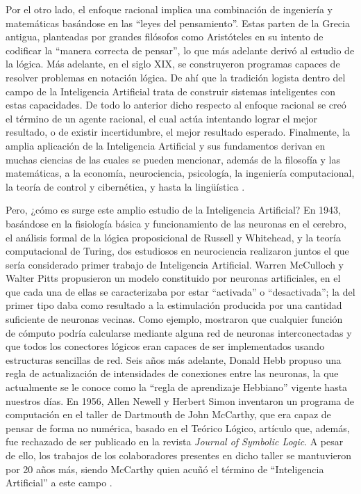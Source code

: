 Por el otro lado, el enfoque racional implica una combinación de ingeniería y matemáticas basándose en las “leyes del pensamiento”. Estas parten de la Grecia antigua, planteadas por grandes filósofos como Aristóteles en su intento de codificar la “manera correcta de pensar”, lo que más adelante derivó al estudio de la lógica. Más adelante, en el siglo XIX, se construyeron programas capaces de resolver problemas en notación lógica. De ahí que la tradición logista dentro del campo de la Inteligencia Artificial trata de construir sistemas inteligentes con estas capacidades. De todo lo anterior dicho respecto al enfoque racional se creó el término de un agente racional, el cual actúa intentando lograr el mejor resultado, o de existir incertidumbre, el mejor resultado esperado. Finalmente, la amplia aplicación de la Inteligencia Artificial y sus fundamentos derivan en muchas ciencias de las cuales se pueden mencionar, además de la filosofía y las matemáticas, a la economía, neurociencia, psicología, la ingeniería computacional, la teoría de control y cibernética, y hasta la lingüística \parencite{bk_russell2004intart}.

Pero, ¿cómo es surge este amplio estudio de la Inteligencia Artificial? En 1943, basándose en la fisiología básica y funcionamiento de las neuronas en el cerebro, el análisis formal de la lógica proposicional de Russell y Whitehead, y la teoría computacional de Turing, dos estudiosos en neurociencia realizaron juntos el que sería considerado primer trabajo de Inteligencia Artificial. Warren McCulloch y Walter Pitts propusieron un modelo constituido por neuronas artificiales, en el que cada una de ellas se caracterizaba por estar “activada” o “desactivada”; la del primer tipo daba como resultado a la estimulación producida por una cantidad suficiente de neuronas vecinas. Como ejemplo, mostraron que cualquier función de cómputo podría calcularse mediante alguna red de neuronas interconectadas y que todos los conectores lógicos eran capaces de ser implementados usando estructuras sencillas de red. Seis años más adelante, Donald Hebb propuso una regla de actualización de intensidades de conexiones entre las neuronas, la que actualmente se le conoce como la “regla de aprendizaje Hebbiano” vigente hasta nuestros días. En 1956, Allen Newell y Herbert Simon inventaron un programa de computación en el taller de Dartmouth de John McCarthy, que era capaz de pensar de forma no numérica, basado en el Teórico Lógico, artículo que, además, fue rechazado de ser publicado en la revista \textit{Journal of Symbolic Logic}. A pesar de ello, los trabajos de los colaboradores presentes en dicho taller se mantuvieron por 20 años más, siendo McCarthy quien acuñó el término de “Inteligencia Artificial” a este campo \parencite{bk_russell2004intart}.

